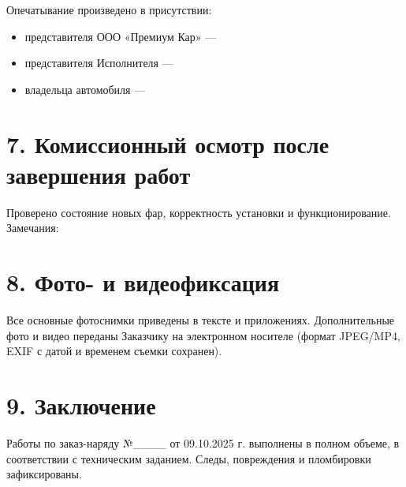 Опечатывание произведено в присутствии:  
\begin{itemize}[noitemsep,topsep=0pt]
	\item представителя ООО «Премиум Кар» — \underline{\hspace{7cm}}
	\item представителя Исполнителя — \underline{\hspace{7cm}}
	\item владельца автомобиля — \underline{\hspace{7cm}}
\end{itemize}


\vspace{1em}

\section*{7. Комиссионный осмотр после завершения работ}

Проверено состояние новых фар, корректность установки и функционирование.  
Замечания: \underline{\hspace{\textwidth}}\\[0.5em]
\underline{\hspace{\textwidth}}


\vspace{1em}

\section*{8. Фото- и видеофиксация}

Все основные фотоснимки приведены в тексте и приложениях.  
Дополнительные фото и видео переданы Заказчику на электронном носителе  
(формат JPEG/MP4, EXIF с датой и временем съемки сохранен).

\vspace{1em}

\section*{9. Заключение}

Работы по заказ-наряду №\_\_\_\_ от 09.10.2025 г. выполнены в полном объеме,  
в соответствии с техническим заданием. Следы, повреждения и пломбировки зафиксированы.

